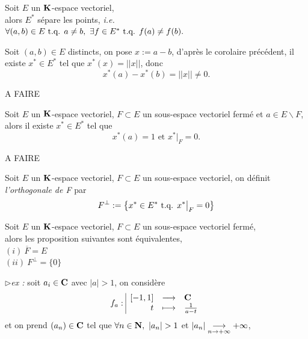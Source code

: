 \documentclass[a4paper,11pt, twoside]{article}
\begin{document}
\begin{corollaire}
  Soit $E$ un $\mathbf K$-espace vectoriel,\\

  alors $E^*$ sépare les points, \emph{i.e.}\\
  $\forall (a,b)\in E\text{ t.q. } a\neq b,\ \exists f\in E^*\text{ t.q. } f(a)\neq f(b).$
\end{corollaire}


\begin{Proof}
  Soit $(a,b)\in E$ distincts, on pose $x:=a-b$, d'après le corolaire précédent, il existe $x^*\in E^*$ tel que $x^*(x)=||x||$, donc 
  $$x^*(a)-x^*(b)=||x||\neq0.$$
\end{Proof}

\begin{Proof}
  A FAIRE
\end{Proof}


\begin{corollaire}
  Soit $E$ un $\mathbf K$-espace vectoriel, $F\subset E$ un sous-espace vectoriel fermé et $a\in E\backslash F$,\\

  alors il existe $x^*\in E^*$ tel que 
  $$x^*(a)=1\text{ et }x^*\big|_F=0.$$
\end{corollaire}


\begin{Proof}
  A FAIRE
\end{Proof}

\begin{Def}
  Soit $E$ un $\mathbf K$-espace vectoriel, $F\subset E$ un sous-espace vectoriel, on définit \emph{l'orthogonale de F} par 
  $$F^\bot:=\left\{x^*\in E^*\text{ t.q. } x^*\big|_F=0\right\}$$
\end{Def}


\begin{corollaire}
  Soit $E$ un $\mathbf K$-espace vectoriel, $F\subset E$ un sous-espace vectoriel fermé,\\

  alors les proposition suivantes sont équivalentes,\\
  $(i)\ \overline{F}=E$\\
  $(ii)\ F^\bot=\{0\}$
\end{corollaire}


$\triangleright$\emph{ex :} soit $a_i\in\mathbf C$ avec $|a|>1$, on considère
$$f_a:\begin{array}{|rcl}
  [-1,1]&\longrightarrow&\mathbf C\\
  t&\longmapsto&\frac{1}{a-t}
\end{array}$$
et on prend $(a_n)\in \mathbf C$ tel que $\forall n\in\N,\ |a_n|>1$ et $|a_n|\underset{n\to+\infty}{\longrightarrow} +\infty$,\\
\end{document}

